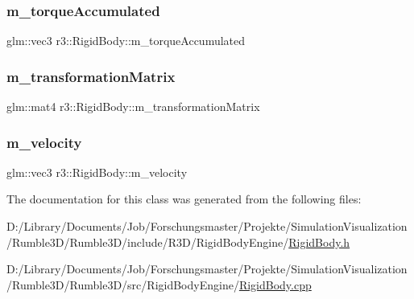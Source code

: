 \mbox{\label{classr3_1_1_rigid_body_a51d3583c700e3bf071fce532a960bb98}} 
\subsubsection{\texorpdfstring{m\+\_\+torque\+Accumulated}{m\_torqueAccumulated}}
{\footnotesize\ttfamily glm\+::vec3 r3\+::\+Rigid\+Body\+::m\+\_\+torque\+Accumulated\hspace{0.3cm}{\ttfamily [protected]}}

\mbox{\label{classr3_1_1_rigid_body_ab973e24d84aedb3188aa04fcd2817228}} 
\subsubsection{\texorpdfstring{m\+\_\+transformation\+Matrix}{m\_transformationMatrix}}
{\footnotesize\ttfamily glm\+::mat4 r3\+::\+Rigid\+Body\+::m\+\_\+transformation\+Matrix\hspace{0.3cm}{\ttfamily [protected]}}

\mbox{\label{classr3_1_1_rigid_body_a2de7cddcf262009fc8261688d1e56c49}} 
\subsubsection{\texorpdfstring{m\+\_\+velocity}{m\_velocity}}
{\footnotesize\ttfamily glm\+::vec3 r3\+::\+Rigid\+Body\+::m\+\_\+velocity\hspace{0.3cm}{\ttfamily [protected]}}



The documentation for this class was generated from the following files\+:\begin{DoxyCompactItemize}
\item 
D\+:/\+Library/\+Documents/\+Job/\+Forschungsmaster/\+Projekte/\+Simulation\+Visualization/\+Rumble3\+D/\+Rumble3\+D/include/\+R3\+D/\+Rigid\+Body\+Engine/\mbox{\hyperlink{_rigid_body_8h}{Rigid\+Body.\+h}}\item 
D\+:/\+Library/\+Documents/\+Job/\+Forschungsmaster/\+Projekte/\+Simulation\+Visualization/\+Rumble3\+D/\+Rumble3\+D/src/\+Rigid\+Body\+Engine/\mbox{\hyperlink{_rigid_body_8cpp}{Rigid\+Body.\+cpp}}\end{DoxyCompactItemize}
